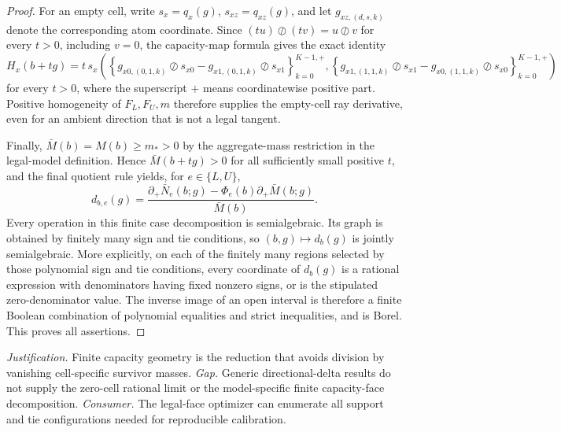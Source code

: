 \documentclass{article}
\begin{document}
\begin{proof}
For an empty cell, write \(s_x=q_x(g)\), \(s_{xz}=q_{xz}(g)\), and let \(g_{xz,(d,s,k)}\) denote the corresponding atom coordinate.  Since \((tu)\oslash(tv)=u\oslash v\) for every \(t>0\), including \(v=0\), the capacity-map formula gives the exact identity
\[
H_x(b+tg)=t\,s_x
\left(
\left\{g_{x0,(0,1,k)}\oslash s_{x0}-g_{x1,(0,1,k)}\oslash s_{x1}\right\}_{k=0}^{K-1,+},
\left\{g_{x1,(1,1,k)}\oslash s_{x1}-g_{x0,(1,1,k)}\oslash s_{x0}\right\}_{k=0}^{K-1,+}
\right)
\]
for every \(t>0\), where the superscript \(+\) means coordinatewise positive part.  Positive homogeneity of \(F_L,F_U,m\) therefore supplies the empty-cell ray derivative, even for an ambient direction that is not a legal tangent.

Finally, \(\bar M(b)=M(b)\ge m_*>0\) by the aggregate-mass restriction in the legal-model definition.  Hence \(\bar M(b+tg)>0\) for all sufficiently small positive \(t\), and the final quotient rule yields, for \(e\in\{L,U\}\),
\[
d_{b,e}(g)=
\frac{\partial_+\bar N_e(b;g)-\Phi_e(b)\partial_+\bar M(b;g)}{\bar M(b)}.
\]
Every operation in this finite case decomposition is semialgebraic.  Its graph is obtained by finitely many sign and tie conditions, so \((b,g)\mapsto d_b(g)\) is jointly semialgebraic.  More explicitly, on each of the finitely many regions selected by those polynomial sign and tie conditions, every coordinate of \(d_b(g)\) is a rational expression with denominators having fixed nonzero signs, or is the stipulated zero-denominator value.  The inverse image of an open interval is therefore a finite Boolean combination of polynomial equalities and strict inequalities, and is Borel.  This proves all assertions.
\end{proof}
\par\smallskip\noindent \textit{Justification.} Finite capacity geometry is the reduction that avoids division by vanishing cell-specific survivor masses. \textit{Gap.} Generic directional-delta results do not supply the zero-cell rational limit or the model-specific finite capacity-face decomposition. \textit{Consumer.} The legal-face optimizer can enumerate all support and tie configurations needed for reproducible calibration.
\end{document}
